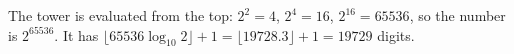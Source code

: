 The tower is evaluated from the top: $2^2=4$, $2^4=16$, $2^{16}=65536$, so the number is $2^{65536}$. It has $\lfloor65536\log_{10}2\rfloor+1=\lfloor19728.3\rfloor+1=\boxed{19729}$ digits.
